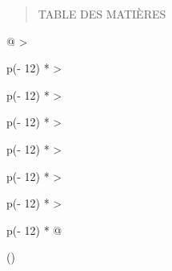 \documentclass[
]{article}
\begin{document}
\begin{quote}
TABLE DES MATIÈRES
\end{quote}

\begin{longtable}[]{@{}
  >{\raggedright\arraybackslash}p{(\columnwidth - 12\tabcolsep) * }
  >{\raggedright\arraybackslash}p{(\columnwidth - 12\tabcolsep) * }
  >{\raggedright\arraybackslash}p{(\columnwidth - 12\tabcolsep) * }
  >{\raggedright\arraybackslash}p{(\columnwidth - 12\tabcolsep) * }
  >{\raggedright\arraybackslash}p{(\columnwidth - 12\tabcolsep) * }
  >{\raggedright\arraybackslash}p{(\columnwidth - 12\tabcolsep) * }
  >{\raggedright\arraybackslash}p{(\columnwidth - 12\tabcolsep) * }@{}}
\toprule()
\end{longtable}
\end{document}
